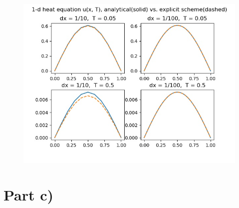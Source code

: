 \documentclass[10pt,a4paper]{article}
\begin{document}
\begin{figure}[!ht]
	
	\begin{center}
		\includegraphics[width=\textwidth]{forward_plot.jpg}
	\end{center}
	\label{slice}
	
\end{figure}

\section*{Part c)}
\end{document}
